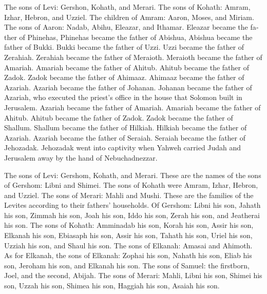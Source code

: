 \begin{paracol}{2}
\begin{otherlanguage}{english}
 The sons of Levi: Gershon, Kohath, and Merari.
 The sons of Kohath: Amram, Izhar, Hebron, and Uzziel.
 The children of Amram: Aaron, Moses, and Miriam. The sons
of Aaron: Nadab, Abihu, Eleazar, and Ithamar.  Eleazar
became the father of Phinehas, Phinehas became the father of Abishua,
 Abishua became the father of Bukki. Bukki became the
father of Uzzi.  Uzzi became the father of Zerahiah.
Zerahiah became the father of Meraioth.  Meraioth became
the father of Amariah. Amariah became the father of Ahitub.
 Ahitub became the father of Zadok. Zadok became the
father of Ahimaaz.  Ahimaaz became the father of Azariah.
Azariah became the father of Johanan.  Johanan became the
father of Azariah, who executed the priest's office in the house that
Solomon built in Jerusalem.  Azariah became the father of
Amariah. Amariah became the father of Ahitub.  Ahitub
became the father of Zadok. Zadok became the father of Shallum.
 Shallum became the father of Hilkiah. Hilkiah became the
father of Azariah.  Azariah became the father of Seraiah.
Seraiah became the father of Jehozadak.  Jehozadak went
into captivity when Yahweh carried Judah and Jerusalem away by the hand
of Nebuchadnezzar.

 The sons of Levi: Gershom, Kohath, and Merari.
 These are the names of the sons of Gershom: Libni and
Shimei.  The sons of Kohath were Amram, Izhar, Hebron,
and Uzziel.  The sons of Merari: Mahli and Mushi. These
are the families of the Levites according to their fathers' households.
 Of Gershom: Libni his son, Jahath his son, Zimmah his
son,  Joah his son, Iddo his son, Zerah his son, and
Jeatherai his son.  The sons of Kohath: Amminadab his
son, Korah his son, Assir his son,  Elkanah his son,
Ebiasaph his son, Assir his son,  Tahath his son, Uriel
his son, Uzziah his son, and Shaul his son.  The sons of
Elkanah: Amasai and Ahimoth.  As for Elkanah, the sons of
Elkanah: Zophai his son, Nahath his son,  Eliab his son,
Jeroham his son, and Elkanah his son.  The sons of
Samuel: the firstborn, Joel, and the second, Abijah.  The
sons of Merari: Mahli, Libni his son, Shimei his son, Uzzah his son,
 Shimea his son, Haggiah his son, Asaiah his son.


\end{otherlanguage}
\end{paracol}
